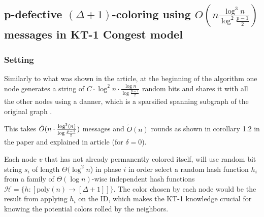 \documentclass[11pt]{article}
\begin{document}
\subsection{\texorpdfstring{p-defective $(\Delta+1)$-coloring using $O(n \frac{\log^3{n}}{\log^2{\frac{p-1}{2}}})$ messages in KT-1 Congest model}{}}

\subsubsection*{Setting}

Similarly to what was shown in the article, at the beginning of the algorithm one node generates a string of  $C \cdot \log^2{n} \cdot \frac{\log{n}}{\log{\frac{p-1}{2}}}$ random bits and shares it with all the other nodes using a danner, which is a sparsified spanning subgraph of the original graph \cite{Gmyr}.

This takes $\Tilde{O}(n \cdot \frac{\log^3(n)}{\log{\frac{p-1}{2}}})$ messages and $\tilde{O}(n)$ rounds as shown in corollary 1.2 in the paper and explained in article \cite{Gmyr} (for $\delta = 0$).






Each node $v$ that has not already permanently colored itself, will use random bit string $s_i$ of length $\Theta(\log^2{n}$) in phase $i$ in order select a random hash function $h_i$ from a family of $\Theta(\log{n})$-wise independent hash functions $\mathcal{H}=\{h:[\text{poly}(n) \xrightarrow{} [\Delta+1]] \}$. The color chosen by each node would be the result from applying $h_i$ on the ID, which makes the KT-1 knowledge crucial for knowing the potential colors rolled by the neighbors.
\end{document}
